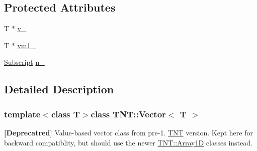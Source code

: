 \subsection*{Protected Attributes}
\begin{DoxyCompactItemize}
\item 
T $\ast$ \hyperlink{classTNT_1_1Vector_a67b413bf6956350ff9dda9faee707433}{v\-\_\-}
\item 
T $\ast$ \hyperlink{classTNT_1_1Vector_a55f5ebf43f5af53aabdfae15a1ce11d4}{vm1\-\_\-}
\item 
\hyperlink{namespaceTNT_af22e3f1460e145c04ce4e7d701e4c1c1}{Subscript} \hyperlink{classTNT_1_1Vector_accfd20cf0105ad3c153aeebf728f5bbc}{n\-\_\-}
\end{DoxyCompactItemize}


\subsection{Detailed Description}
\subsubsection*{template$<$class T$>$class T\-N\-T\-::\-Vector$<$ T $>$}

{\bfseries \mbox{[}Deprecatred\mbox{]}} Value-\/based vector class from pre-\/1. \hyperlink{namespaceTNT}{T\-N\-T} version. Kept here for backward compatiblity, but should use the newer \hyperlink{classTNT_1_1Array1D}{T\-N\-T\-::\-Array1\-D} classes instead. 


